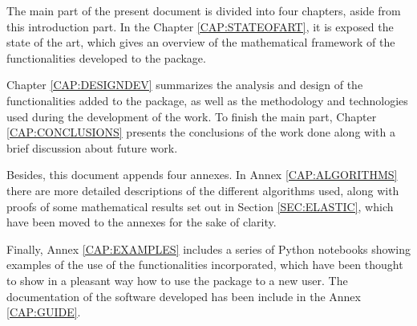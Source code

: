 The main part of the present document is divided into four chapters, aside from 
this introduction part. In the Chapter \ref{CAP:STATEOFART}, it is exposed the
state of the art, which gives an overview of the mathematical framework of the
functionalities developed to the package.

Chapter \ref{CAP:DESIGNDEV} summarizes the analysis and design of the
functionalities added to the package, as well as the methodology and
technologies used during the development of the work. To finish the main part,
Chapter \ref{CAP:CONCLUSIONS} presents the conclusions of the work done along
with a brief discussion about future work.

Besides, this document appends four annexes. In Annex \ref{CAP:ALGORITHMS} there are
more detailed descriptions of the different algorithms used, along with proofs of
some mathematical results set out
in Section \ref{SEC:ELASTIC}, which have been moved to the annexes for the
sake of clarity.

Finally, Annex \ref{CAP:EXAMPLES} includes a series of Python notebooks showing
examples of the use of the functionalities incorporated, which have been thought
to show in a pleasant way how to use the package to a new user. The
documentation of the software developed has been include in the
Annex \ref{CAP:GUIDE}.
